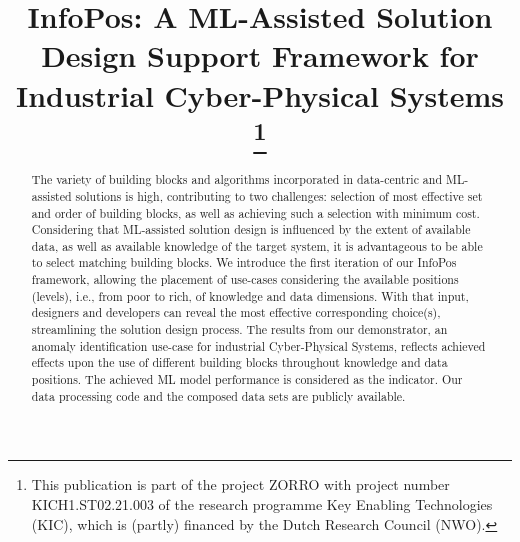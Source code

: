 \documentclass[conference]{IEEEtran}
\begin{document}
\title{InfoPos: A ML-Assisted Solution Design Support Framework for Industrial Cyber-Physical Systems \\
\thanks{This publication is part of the project ZORRO with project number KICH1.ST02.21.003 of the research programme Key Enabling Technologies (KIC), which is (partly) financed by the Dutch Research Council (NWO).}
}

\author{
}


\maketitle

\begin{abstract}
The variety of building blocks and algorithms incorporated in data-centric and ML-assisted solutions is high, contributing to two challenges: selection of most effective set and order of building blocks, as well as achieving such a selection with minimum cost. Considering that ML-assisted solution design is influenced by the extent of available data, as well as available knowledge of the target system, it is advantageous to be able to select matching building blocks. We introduce the first iteration of our InfoPos framework, allowing the placement of use-cases considering the available positions (levels), i.e., from poor to rich, of knowledge and data dimensions. With that input, designers and developers can reveal the most effective corresponding choice(s), streamlining the solution design process. The results from our demonstrator, an anomaly identification use-case for industrial Cyber-Physical Systems, reflects achieved effects upon the use of different building blocks throughout knowledge and data positions. The achieved ML model performance is considered as the indicator. Our data processing code and the composed data sets are publicly available.
\end{abstract}
\end{document}
